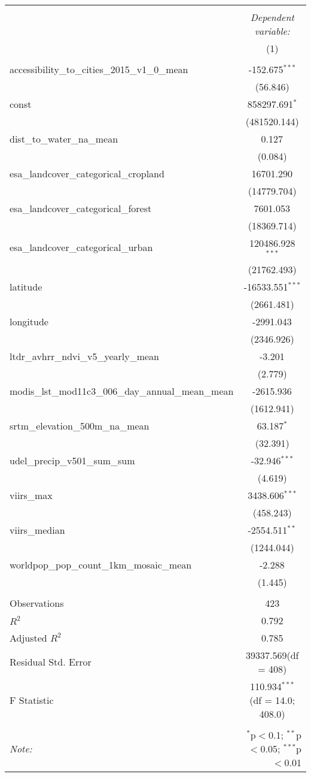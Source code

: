 \begin{table}[!htbp] \centering
\begin{tabular}{@{\extracolsep{5pt}}lc}
\\[-1.8ex]\hline
\hline \\[-1.8ex]
& \multicolumn{1}{c}{\textit{Dependent variable:}} \
\cr \cline{1-2}
\\[-1.8ex] & (1) \\
\hline \\[-1.8ex]
 accessibility_to_cities_2015_v1_0_mean & -152.675$^{***}$ \\
  & (56.846) \\
 const & 858297.691$^{*}$ \\
  & (481520.144) \\
 dist_to_water_na_mean & 0.127$^{}$ \\
  & (0.084) \\
 esa_landcover_categorical_cropland & 16701.290$^{}$ \\
  & (14779.704) \\
 esa_landcover_categorical_forest & 7601.053$^{}$ \\
  & (18369.714) \\
 esa_landcover_categorical_urban & 120486.928$^{***}$ \\
  & (21762.493) \\
 latitude & -16533.551$^{***}$ \\
  & (2661.481) \\
 longitude & -2991.043$^{}$ \\
  & (2346.926) \\
 ltdr_avhrr_ndvi_v5_yearly_mean & -3.201$^{}$ \\
  & (2.779) \\
 modis_lst_mod11c3_006_day_annual_mean_mean & -2615.936$^{}$ \\
  & (1612.941) \\
 srtm_elevation_500m_na_mean & 63.187$^{*}$ \\
  & (32.391) \\
 udel_precip_v501_sum_sum & -32.946$^{***}$ \\
  & (4.619) \\
 viirs_max & 3438.606$^{***}$ \\
  & (458.243) \\
 viirs_median & -2554.511$^{**}$ \\
  & (1244.044) \\
 worldpop_pop_count_1km_mosaic_mean & -2.288$^{}$ \\
  & (1.445) \\
\hline \\[-1.8ex]
 Observations & 423 \\
 $R^2$ & 0.792 \\
 Adjusted $R^2$ & 0.785 \\
 Residual Std. Error & 39337.569(df = 408)  \\
 F Statistic & 110.934$^{***}$ (df = 14.0; 408.0) \\
\hline
\hline \\[-1.8ex]
\textit{Note:} & \multicolumn{1}{r}{$^{*}$p$<$0.1; $^{**}$p$<$0.05; $^{***}$p$<$0.01} \\
\end{tabular}
\end{table}